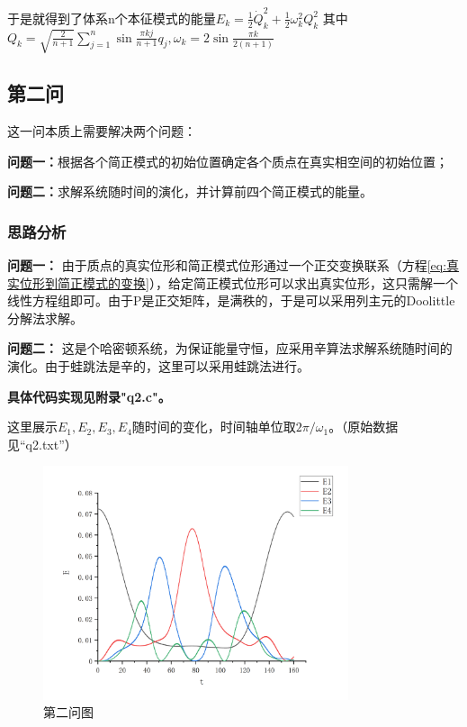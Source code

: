 \documentclass[10pt, a4paper]{article}
\begin{document}
    于是就得到了体系n个本征模式的能量$E_k=\frac{1}{2}\dot{Q}_k^2+\frac{1}{2}\omega_k^2 Q_k^2$
    其中$Q_k=\sqrt{\frac{2}{n+1}}\sum_{j=1}^n\sin\frac{\pi k j}{n+1}q_j,\omega_k=2\sin\frac{\pi k}{2(n+1)}$

    \subsection{第二问}

    这一问本质上需要解决两个问题：

    \textbf{问题一：}根据各个简正模式的初始位置确定各个质点在真实相空间的初始位置；

    \textbf{问题二：}求解系统随时间的演化，并计算前四个简正模式的能量。

    \subsubsection{思路分析}

    \textbf{问题一：}
    由于质点的真实位形和简正模式位形通过一个正交变换联系（方程\ref{eq:真实位形到简正模式的变换}），给定简正模式位形可以求出真实位形，这只需解一个线性方程组即可。由于P是正交矩阵，是满秩的，于是可以采用列主元的Doolittle分解法求解。

    \textbf{问题二：}
    这是个哈密顿系统，为保证能量守恒，应采用辛算法求解系统随时间的演化。由于蛙跳法是辛的，这里可以采用蛙跳法进行。

    \textbf{具体代码实现见附录"q2.c"。}

    这里展示$E_1,E_2,E_3,E_4$随时间的变化，时间轴单位取$2\pi/\omega_1$。（原始数据见“q2.txt”）

    \begin{figure}[H]
        \centering
        \includegraphics[width=0.8\textwidth]{第二问图.jpg}
        \caption{第二问图}\label{fig:第二问图}
    \end{figure}
\end{document}
